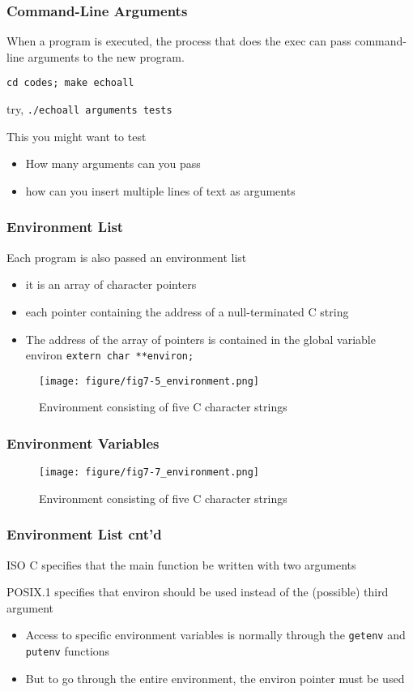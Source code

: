 \documentclass[newPxFont,sthlmFooter,nooffset]{beamer}
\begin{document}
\begin{frame}
  \frametitle{Command-Line Arguments}
When a program is executed, the process that does the exec can pass command-line arguments to the new program.

\texttt{cd codes; make echoall}



try,
\texttt{./echoall arguments tests}

This you might want to test
\begin{itemize}
\item How many arguments can you pass
\item how can you insert multiple lines of text as arguments
\end{itemize}
\end{frame}

\begin{frame}[t]
  \frametitle{Environment List}
Each program is also passed an environment list
\begin{itemize}
\item it is an array of character pointers
\item each pointer containing the address of a null-terminated C
  string
\item The address of the array of pointers is contained in the global variable environ \texttt{extern char **environ;}
\end{itemize}

\begin{figure}[h]
  \centering
  \texttt{[image: figure/fig7-5\_environment.png]}
  \caption{Environment consisting of five C character strings}
\end{figure}
\end{frame}

\begin{frame}[t]
  \frametitle{Environment Variables}
\begin{figure}[h]
  \centering
  \texttt{[image: figure/fig7-7\_environment.png]}
  \caption{Environment consisting of five C character strings}
\end{figure}
\end{frame}

\begin{frame}[t]
  \frametitle{Environment List cnt'd}
ISO C specifies that the main function be written with two arguments

POSIX.1 specifies that environ should be used instead of the (possible) third argument
\begin{itemize}
\item Access to specific environment variables is normally through the
  \texttt{getenv} and \texttt{putenv} functions
\item But to go through the entire environment, the environ pointer must be used
\end{itemize}

\end{frame}
\end{document}
